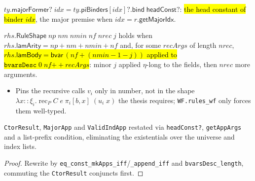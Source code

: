 \begin{definition}
\label{def:ind-major-former}
\leanok
{} 

 $ty.\mathsf{majorFormer?}\;idx = ty.\mathsf{piBinders}[idx]?.\mathsf{bind}\;\mathsf{headConst?}$:
\hl{the head constant of binder $idx$}, the major premise when $idx=r.\mathsf{getMajorIdx}$.
\end{definition}

\begin{definition}
\label{def:ind-rule-shape}
\leanok
{} 

 $rhs.\mathsf{RuleShape}\;np\;nm\;nmin\;nf\;nrec\;j$ holds when
$rhs.\mathsf{lamArity} = np+nm+nmin+nf$ and, for some $recArgs$ of length $nrec$,
\hl{$rhs.\mathsf{lamBody} = \mathsf{bvar}\,(nf+(nmin-1-j))$ applied to
$\texttt{bvarsDesc}\;0\;nf \mathbin{+\!\!+} recArgs$}: minor $j$ applied $\eta$-long to the
fields, then $nrec$ more arguments.
\begin{itemize}
\item {} Pins the recursive calls $v_i$ only in number, not in the shape
$\lambda x{::}\xi_i.\;\mathrm{rec}_P\;C\;e\;\pi_i[b,x]\;(u_i\;x)$ the thesis requires;
\texttt{WF.rules\_wf} only forces them well-typed.
\end{itemize}
\end{definition}

\begin{lemma}
\label{family:ind-shape-iff}
\leanok
{} 

 \texttt{CtorResult}, \texttt{MajorApp} and \texttt{ValidIndApp} restated via
\texttt{headConst?}, \texttt{getAppArgs} and a list-prefix condition, eliminating the
existentials over the universe and index lists.
\end{lemma}
\begin{proof}
\leanok
{} Rewrite by \texttt{eq\_const\_mkApps\_iff}/\texttt{\_append\_iff} and
\texttt{bvarsDesc\_length}, commuting the \texttt{CtorResult} conjuncts first.
\end{proof}


